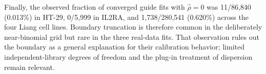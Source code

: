 Finally, the observed fraction of converged guide fits with
$\widehat\rho=0$ was 11/86,840 (0.013\%) in HT-29, 0/5,999 in IL2RA, and
1,738/280,541 (0.620\%) across the four Liang cell lines.  Boundary truncation
is therefore common in the deliberately near-binomial grid but rare in the
three real-data fits.  That observation rules out the boundary as a general
explanation for their calibration behavior; limited independent-library
degrees of freedom and the plug-in treatment of dispersion remain relevant.
